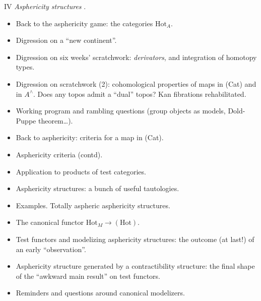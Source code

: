 \documentclass[11pt,a4paper]{article}
\begin{document}
IV \struck{\ill{}} \emph{Asphericity structures} .
\begin{itemize}
  \item[67.] Back to the asphericity game: the categories $\mathrm{Hot}_{A}$.
  \item[68.] Digression on a ``new continent''.
  \item[69.] Digression on six weeks' scratchwork: \emph{derivators}, and integration of homotopy types.
  \item[70.] Digression on scratchwork (2): cohomological properties of maps in (Cat) and in $A^{\wedge}$. Does any topos admit a ``dual'' topos? Kan fibrations rehabilitated.
  \item[71.] Working program and rambling questions (group objects as models, Dold-Puppe theorem…).
  \item[(72.)] Back to asphericity: criteria for a map in (Cat).
  \item[73.] Asphericity criteria (contd).
  \item[74.] Application to products of test categories.
  \item[(75.)] Asphericity structures: a bunch of useful tautologies.
  \item[76.] Examples. Totally aspheric asphericity structures.
  \item[(77.)] The canonical functor $\mathrm{Hot}_{M}\to(\mathrm{Hot})$.
  \item[78.] Test functors and modelizing asphericity structures: the outcome (at last!) of an early ``observation''.
  \item[(79.)] Asphericity structure generated by a contractibility structure: the final shape of the ``awkward main result'' on test functors.
  \item[80.] Reminders and questions around canonical modelizers.
\end{itemize}
\end{document}

